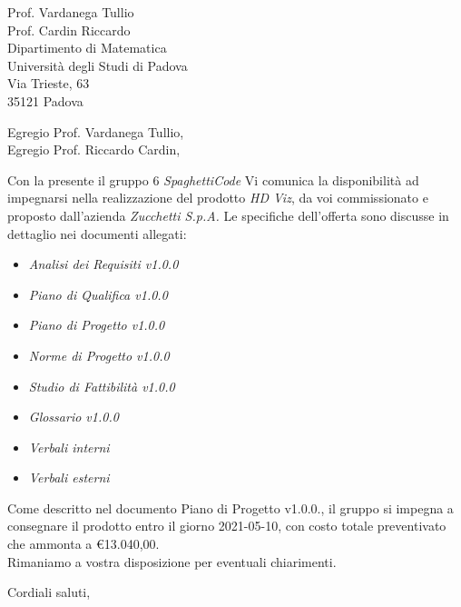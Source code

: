 \documentclass[a4paper,12pt]{letteracdp}
\date{11 gennaio 2021}
\begin{document}
\begin{letter}{
		Prof. Vardanega Tullio \\
		Prof. Cardin Riccardo \\
		Dipartimento di Matematica \\
		Università degli Studi di Padova \\
		Via Trieste, 63 \\
		35121 Padova}
	
	\opening{Egregio Prof. Vardanega Tullio, \\ \noindent Egregio Prof. Riccardo Cardin,}
	
	\begin{flushleft}
	Con la presente il gruppo 6 \textit{SpaghettiCode} Vi comunica la disponibilità ad impegnarsi nella realizzazione del prodotto \textit{HD Viz}, da voi commissionato e proposto dall'azienda \textit{Zucchetti S.p.A.}
	Le specifiche dell'offerta sono discusse in dettaglio nei documenti allegati:
	\end{flushleft}

	\begin{itemize}
		\item \emph{Analisi dei Requisiti v1.0.0}
		\item \emph{Piano di Qualifica v1.0.0}
		\item \emph{Piano di Progetto v1.0.0}
		\item \emph{Norme di Progetto v1.0.0}
		\item \emph{Studio di Fattibilità v1.0.0}
		\item \emph{Glossario v1.0.0}
		\item \emph{Verbali interni}
		\item \emph{Verbali esterni}
	\end{itemize}

	\begin{flushleft}
	\noindent Come descritto nel documento Piano di Progetto v1.0.0., il gruppo si impegna a consegnare il prodotto entro il giorno 2021-05-10, con costo totale preventivato che ammonta a \euro{13.040,00}.
	\\
	
	Rimaniamo a vostra disposizione per eventuali chiarimenti.
	\end{flushleft}

	\closing{Cordiali saluti,}
	
\end{letter}	
\end{document}
